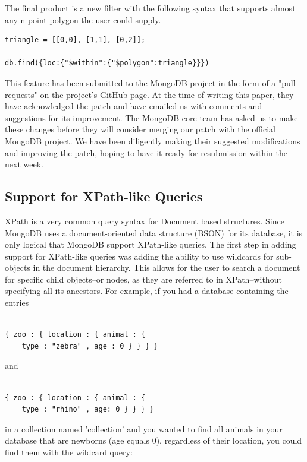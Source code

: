 \documentclass{../dependencies/acm_proc_article-sp}
\begin{document}
The final product is a new filter with the following syntax that supports 
almost any n-point polygon the user could supply.
\begin{lstlisting}
triangle = [[0,0], [1,1], [0,2]];

db.find({loc:{"$within":{"$polygon":triangle}}})
\end{lstlisting}


This feature has been submitted to the MongoDB project in the form
of a "pull requests" on the project's GitHub page\cite{4}.
At the time of writing this paper, they have acknowledged the patch and have 
emailed us with comments and suggestions for its improvement. The MongoDB core team has
asked us to make these changes before they will consider merging our patch with the official MongoDB project. 
We have been diligently making their suggested modifications
and improving the patch, hoping to have it ready for resubmission within the next week.

\subsection{Support for XPath-like Queries}
XPath is a very common query syntax for Document based structures. Since MongoDB
uses a document-oriented data structure (BSON) for its database, it is only logical
that MongoDB support XPath-like queries. The first step in adding support for XPath-like
queries was adding the ability to use wildcards for sub-objects in the document
hierarchy. This allows for the user to search a document for specific child objects--or
nodes, as they are referred to in XPath--without specifying all its ancestors. For example, if you had a database containing the entries

\begin{lstlisting}

{ zoo : { location : { animal : {
    type : "zebra" , age : 0 } } } }
\end{lstlisting}

and

\begin{lstlisting}

{ zoo : { location : { animal : {
    type : "rhino" , age: 0 } } } }
\end{lstlisting}

in a collection named 'collection' and you wanted to find all animals in your database that are newborns (age equals 0), regardless of their location, you could find them with the wildcard query:
\end{document}
